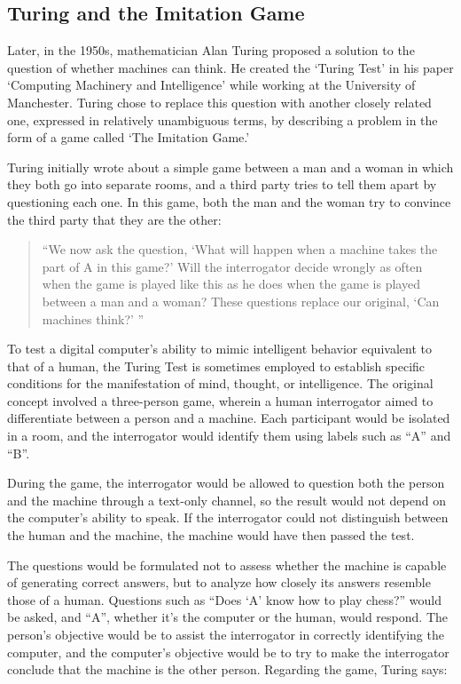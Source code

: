 \documentclass{article}
\begin{document}
\subsection{Turing and the Imitation Game}
Later, in the 1950s, mathematician Alan Turing proposed a solution to the question of whether machines can think. He created the `Turing Test' in his paper `Computing Machinery and Intelligence' while working at the University of Manchester. Turing chose to replace this question with another closely related one, expressed in relatively unambiguous terms, by describing a problem in the form of a game called `The Imitation Game.' 
\par
Turing initially wrote about a simple game between a man and a woman in which they both go into separate rooms, and a third party tries to tell them apart by questioning each one. In this game, both the man and the woman try to convince the third party that they are the other: 
\par
\begin{quote}
``We now ask the question, `What will happen when a machine takes the part of A in this game?' Will the interrogator decide wrongly as often when the game is played like this as he does when the game is played between a man and a woman? These questions replace our original, `Can machines think?' '' \cite{turing1950computing}
\end{quote}
\par
To test a digital computer's ability to mimic intelligent behavior equivalent to that of a human, the Turing Test is sometimes employed to establish specific conditions for the manifestation of mind, thought, or intelligence. The original concept involved a three-person game, wherein a human interrogator aimed to differentiate between a person and a machine. Each participant would be isolated in a room, and the interrogator would identify them using labels such as ``A'' and ``B''. 
\par
During the game, the interrogator would be allowed to question both the person and the machine through a text-only channel, so the result would not depend on the computer's ability to speak. If the interrogator could not distinguish between the human and the machine, the machine would have then passed the test. 
\par
The questions would be formulated not to assess whether the machine is capable of generating correct answers, but to analyze how closely its answers resemble those of a human. Questions such as ``Does `A' know how to play chess?'' would be asked, and ``A'', whether it's the computer or the human, would respond. The person's objective would be to assist the interrogator in correctly identifying the computer, and the computer's objective would be to try to make the interrogator conclude that the machine is the other person. Regarding the game, Turing says: 
\end{document}
